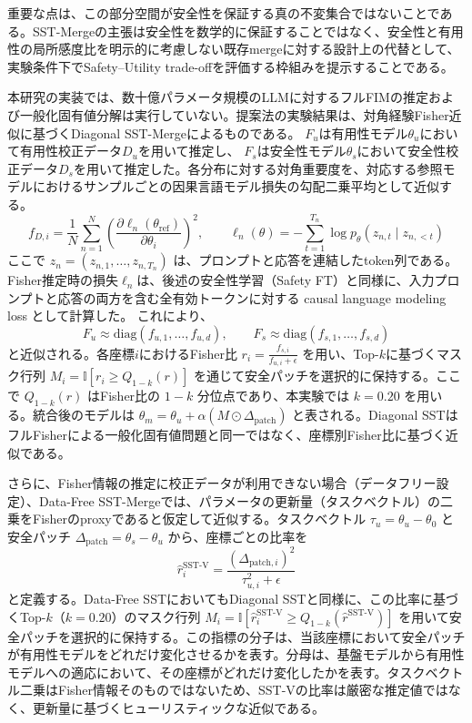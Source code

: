 \documentclass{article}
\begin{document}
重要な点は、この部分空間が安全性を保証する真の不変集合ではないことである。SST-Mergeの主張は安全性を数学的に保証することではなく、安全性と有用性の局所感度比を明示的に考慮しない既存mergeに対する設計上の代替として、実験条件下でSafety--Utility trade-offを評価する枠組みを提示することである。

本研究の実装では、数十億パラメータ規模のLLMに対するフルFIMの推定および一般化固有値分解は実行していない。提案法の実験結果は、対角経験Fisher近似に基づくDiagonal SST-Mergeによるものである。
\(F_u\)は有用性モデル\(\theta_u\)において有用性校正データ\(D_u\)を用いて推定し、 \(F_s\)は安全性モデル\(\theta_s\)において安全性校正データ\(D_s\)を用いて推定した。各分布に対する対角重要度を、対応する参照モデルにおけるサンプルごとの因果言語モデル損失の勾配二乗平均として近似する。
\[ f_{D,i} = \frac{1}{N} \sum_{n=1}^{N} \left( \frac{\partial \ell_n(\theta_{\mathrm{ref}})}{\partial \theta_i} \right)^2, \qquad \ell_n(\theta) = -\sum_{t=1}^{T_n} \log p_\theta(z_{n,t}\mid z_{n,<t}) \]
ここで \(z_n=(z_{n,1},\dots,z_{n,T_n})\) は、プロンプトと応答を連結したtoken列である。
Fisher推定時の損失\(\ell_n\)は、後述の安全性学習（Safety FT）と同様に、入力プロンプトと応答の両方を含む全有効トークンに対する causal language modeling loss として計算した。
これにより、
\[
F_u \approx \mathrm{diag}(f_{u,1},\ldots,f_{u,d}), \qquad F_s \approx \mathrm{diag}(f_{s,1},\ldots,f_{s,d})
\]
と近似される。各座標\(i\)におけるFisher比 \(r_i = \frac{f_{s,i}}{f_{u,i}+\epsilon}\) を用い、Top-$k$に基づくマスク行列 $M_i = \mathbb{I} \left[ r_i \geq Q_{1-k}(r) \right]$ を通じて安全パッチを選択的に保持する。ここで $Q_{1-k}(r)$ はFisher比の $1-k$ 分位点であり、本実験では $k=0.20$ を用いる。統合後のモデルは $\theta_m = \theta_u + \alpha (M \odot \Delta_{\mathrm{patch}})$ と表される。Diagonal SSTはフルFisherによる一般化固有値問題と同一ではなく、座標別Fisher比に基づく近似である。

さらに、Fisher情報の推定に校正データが利用できない場合（データフリー設定）、Data-Free SST-Mergeでは、パラメータの更新量（タスクベクトル）の二乗をFisherのproxyであると仮定して近似する。タスクベクトル \(\tau_u = \theta_u - \theta_0\) と安全パッチ \(\Delta_{\mathrm{patch}} = \theta_s - \theta_u\) から、座標ごとの比率を
\[
\hat{r}^{\mathrm{SST\text{-}V}}_i = \frac{(\Delta_{\mathrm{patch},i})^2}{\tau_{u,i}^2+\epsilon}
\]
と定義する。Data-Free SSTにおいてもDiagonal SSTと同様に、この比率に基づくTop-$k$（$k=0.20$）のマスク行列 $M_i = \mathbb{I} \left[ \hat{r}^{\mathrm{SST\text{-}V}}_i \geq Q_{1-k}(\hat{r}^{\mathrm{SST\text{-}V}}) \right]$ を用いて安全パッチを選択的に保持する。この指標の分子は、当該座標において安全パッチが有用性モデルをどれだけ変化させるかを表す。分母は、基盤モデルから有用性モデルへの適応において、その座標がどれだけ変化したかを表す。タスクベクトル二乗はFisher情報そのものではないため、SST-Vの比率は厳密な推定値ではなく、更新量に基づくヒューリスティックな近似である。
\end{document}
